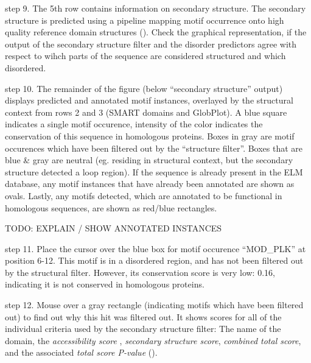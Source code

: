 step 9. The 5th row contains information on secondary structure. The
secondary structure is predicted using a pipeline mapping motif
occurrence onto high quality reference domain structures
(\cite{19852836}). Check the graphical representation, if the output of
the secondary structure filter and the disorder predictors agree with
respect to wihch parts of the sequence are considered structured and
which disordered.

step 10. The remainder of the figure (below ``secondary structure''
output) displays predicted and annotated motif instances, overlayed by
the structural context from rows 2 and 3 (SMART domains and GlobPlot). A
blue square indicates a single motif occurence, intensity of the color
indicates the conservation of this sequence in homologous proteins.
Boxes in gray are motif occurences which have been filtered out by the
``structure filter''. Boxes that are blue \& gray are neutral (eg.
residing in structural context, but the secondary structure detected a
loop region). If the sequence is already present in the ELM database,
any motif instances that have already been annotated are shown as ovals.
Lastly, any motifs detected, which are annotated to be functional in
homologous sequences, are shown as red/blue rectangles.

TODO: EXPLAIN / SHOW ANNOTATED INSTANCES


step 11. Place the cursor over the blue box for motif occurence
``MOD\_PLK'' at position 6-12. This motif is in a disordered region, and
has not been filtered out by the structural filter. However, its
conservation score is very low: 0.16, indicating it is not conserved in
homologous proteins.


step 12. Mouse over a gray rectangle (indicating motifs which have been
filtered out) to find out why this hit was filtered out. It shows scores
for all of the individual criteria used by the secondary structure
filter: The name of the domain, the \emph{accessibility score} ,
\emph{secondary structure score}, \emph{combined total score}, and the
associated \emph{total score P-value} (\cite{19852836}).

